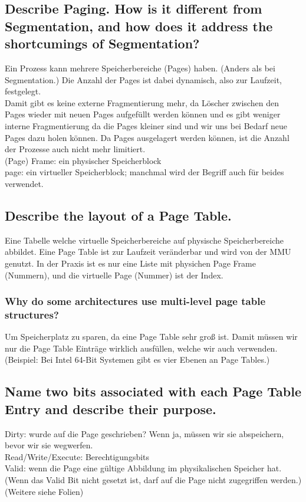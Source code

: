 \subsection{Describe Paging. \important How is it different from Segmentation, and how does it address the shortcumings of Segmentation?}
Ein Prozess kann mehrere Speicherbereiche (Pages) haben.
(Anders als bei Segmentation.)
Die Anzahl der Pages ist dabei dynamisch, also zur Laufzeit, festgelegt.\\
Damit gibt es keine externe Fragmentierung mehr, da Löscher zwischen den Pages wieder mit neuen Pages aufgefüllt werden können und es gibt weniger interne Fragmentierung da die Pages kleiner sind und wir uns bei Bedarf neue Pages dazu holen können.
Da Pages ausgelagert werden können, ist die Anzahl der Prozesse auch nicht mehr limitiert.\\
(Page) Frame: ein physischer Speicherblock\\
page: ein virtueller Speicherblock; manchmal wird der Begriff auch für beides verwendet.

\subsection{Describe the layout of a Page Table.}
Eine Tabelle welche virtuelle Speicherbereiche auf physische Speicherbereiche abbildet.
Eine Page Table ist zur Laufzeit veränderbar und wird von der MMU genutzt.
In der Praxis ist es nur eine Liste mit physichen Page Frame (Nummern), und die virtuelle Page (Nummer) ist der Index.

\subsubsection{Why do some architectures use multi-level page table structures?}
Um Speicherplatz zu sparen, da eine Page Table sehr groß ist. Damit müssen wir nur die Page Table Einträge wirklich ausfüllen, welche wir auch verwenden.
(Beispiel: Bei Intel 64-Bit Systemen gibt es vier Ebenen an Page Tables.)

\subsection{\important Name two bits associated with each Page Table Entry and describe their purpose.}
Dirty: wurde auf die Page geschrieben? Wenn ja, müssen wir sie abspeichern, bevor wir sie wegwerfen.\\
Read/Write/Execute: Berechtigungsbits\\
Valid: wenn die Page eine gültige Abbildung im physikalischen Speicher hat. (Wenn das Valid Bit nicht gesetzt ist, darf auf die Page nicht zugegriffen werden.)\\
(\todo Weitere siehe Folien)

